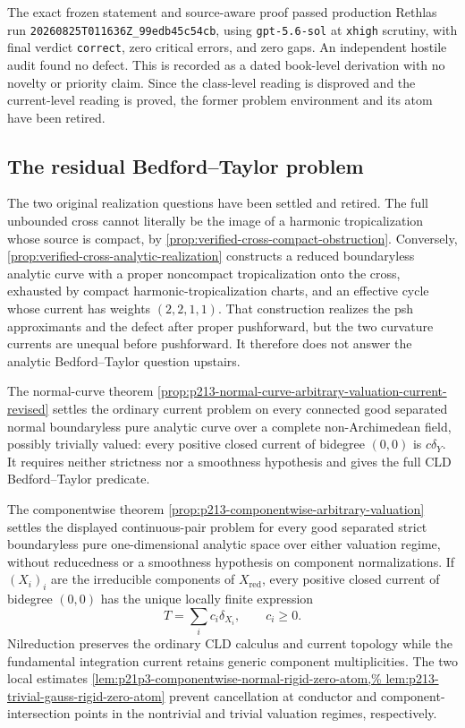 The exact frozen statement and source-aware proof passed production Rethlas
run \nolinkurl{20260825T011636Z_99edb45c54cb}, using
\texttt{gpt-5.6-sol} at \texttt{xhigh} scrutiny, with final verdict
\texttt{correct}, zero critical errors, and zero gaps.  An independent
hostile audit found no defect.  This is recorded as a dated book-level
derivation with no novelty or priority claim.  Since the class-level reading
is disproved and the current-level reading is proved, the former problem
environment and its atom have been retired.

\subsection{The residual Bedford--Taylor problem}
\label{sec:ch72-bedford-taylor}

The two original realization questions have been settled and retired.  The
full unbounded cross cannot literally be the image of a harmonic
tropicalization whose source is compact, by
\cref{prop:verified-cross-compact-obstruction}.  Conversely,
\cref{prop:verified-cross-analytic-realization} constructs a reduced
boundaryless analytic curve with a proper noncompact tropicalization onto
the cross, exhausted by compact harmonic-tropicalization charts, and an
effective cycle whose current has weights \((2,2,1,1)\).  That construction
realizes the psh approximants and the defect after proper pushforward, but
the two curvature currents are unequal before pushforward.  It therefore
does not answer the analytic Bedford--Taylor question upstairs.

The normal-curve theorem
\cref{prop:p213-normal-curve-arbitrary-valuation-current-revised} settles the
ordinary current problem on every connected good separated normal
boundaryless pure analytic curve over a complete non-Archimedean field,
possibly trivially valued: every positive closed current of bidegree
\((0,0)\) is \(c\delta_Y\).  It requires neither strictness nor a smoothness
hypothesis and gives the full CLD Bedford--Taylor predicate.

The componentwise theorem
\cref{prop:p213-componentwise-arbitrary-valuation} settles the displayed
continuous-pair problem for every good separated strict boundaryless pure
one-dimensional analytic space over either valuation regime, without
reducedness or a smoothness hypothesis on component normalizations.  If
\((X_i)_i\) are the irreducible components of \(X_{\mathrm{red}}\), every
positive closed current of bidegree \((0,0)\) has the unique locally finite
expression
\[
                         T=\sum_i c_i\delta_{X_i},
                         \qquad c_i\geq0.
\]
Nilreduction preserves the ordinary CLD calculus and current topology while
the fundamental integration current retains generic component
multiplicities.  The two local estimates
\cref{lem:p21p3-componentwise-normal-rigid-zero-atom,%
lem:p213-trivial-gauss-rigid-zero-atom} prevent cancellation at conductor
and component-intersection points in the nontrivial and trivial valuation
regimes, respectively.

